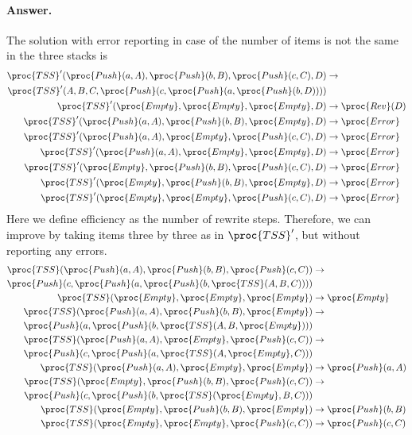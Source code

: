 \paragraph{Answer.} The solution with error reporting in case of the
number of items is not the same in the three stacks is
\begin{align*}
\proc{TSS}'(\proc{Push}(a,A), \proc{Push}(b,B), \proc{Push}(c,C), D)
&\rightarrow\\
\proc{TSS}'(A, B, C, \proc{Push}(c, \proc{Push}(a,
\proc{Push}(b, D))))\\
\proc{TSS}'(\proc{Empty}, \proc{Empty}, \proc{Empty}, D) &\rightarrow
\proc{Rev}(D)\\
\proc{TSS}'(\proc{Push}(a,A), \proc{Push}(b,B), \proc{Empty}, D)
&\rightarrow \proc{Error}\\
\proc{TSS}'(\proc{Push}(a,A), \proc{Empty}, \proc{Push}(c,C), D)
&\rightarrow \proc{Error}\\
\proc{TSS}'(\proc{Push}(a,A), \proc{Empty}, \proc{Empty}, D)
&\rightarrow \proc{Error}\\
\proc{TSS}'(\proc{Empty}, \proc{Push}(b,B), \proc{Push}(c,C), D)
&\rightarrow \proc{Error}\\
\proc{TSS}'(\proc{Empty}, \proc{Push}(b,B), \proc{Empty}, D)
&\rightarrow \proc{Error}\\
\proc{TSS}'(\proc{Empty}, \proc{Empty}, \proc{Push}(c,C), D)
&\rightarrow \proc{Error}
\end{align*}
\noindent Here we define efficiency as the number of rewrite
steps. Therefore, we can improve  by taking items three by
three as in \(\proc{TSS}'\), but without reporting any errors.
\begin{align*}
\proc{TSS}(\proc{Push}(a,A), \proc{Push}(b,B), \proc{Push}(c,C))
&\rightarrow  \notag\\
\proc{Push}(c, \proc{Push}(a,\proc{Push}(b, \proc{TSS}(A, B, C))))\\
\proc{TSS}(\proc{Empty}, \proc{Empty}, \proc{Empty}) &\rightarrow
\proc{Empty}\\
\proc{TSS}(\proc{Push}(a,A), \proc{Push}(b,B), \proc{Empty})
&\rightarrow\\
 \proc{Push}(a, \proc{Push}(b, \proc{TSS}(A,B,\proc{Empty})))\\
\proc{TSS}(\proc{Push}(a,A), \proc{Empty}, \proc{Push}(c,C))
&\rightarrow\\
 \proc{Push}(c, \proc{Push}(a, \proc{TSS}(A, \proc{Empty}, C)))\\
\proc{TSS}(\proc{Push}(a,A), \proc{Empty}, \proc{Empty})
&\rightarrow \proc{Push}(a,A)\\
\proc{TSS}(\proc{Empty}, \proc{Push}(b,B), \proc{Push}(c,C))
&\rightarrow\\
\proc{Push}(c, \proc{Push}(b,\proc{TSS}(\proc{Empty},B,C)))\\
\proc{TSS}(\proc{Empty}, \proc{Push}(b,B), \proc{Empty})
&\rightarrow \proc{Push}(b,B)\\
\proc{TSS}(\proc{Empty}, \proc{Empty}, \proc{Push}(c,C))
&\rightarrow \proc{Push}(c,C)
\end{align*}


